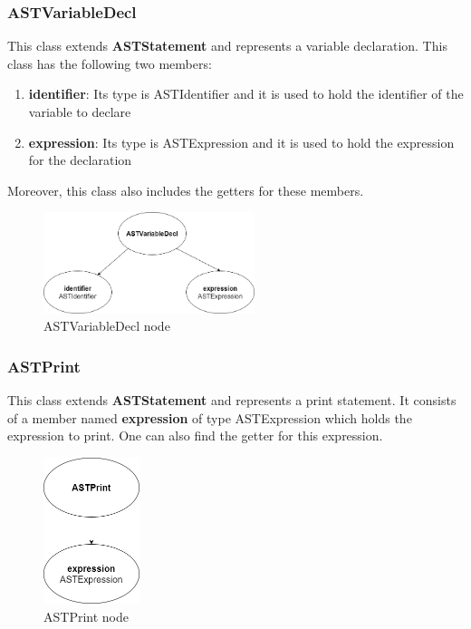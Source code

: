 \documentclass{article}
\begin{document}
					\subsubsection{ASTVariableDecl}
					
					This class extends \textbf{ASTStatement} and represents a variable declaration. This class has the following two members:
					\begin{enumerate}
					\item \textbf{identifier}: Its type is ASTIdentifier and it is used to hold the identifier of the variable to declare
					\item \textbf{expression}: Its type is ASTExpression and it is used to hold the expression for the declaration
					\end{enumerate}	
					Moreover, this class also includes the getters for these members.
			
					\begin{figure}[H]
					\centering
			 			\includegraphics[width=0.55\textwidth]{astvariabledecl.png}
			  			\caption{{ASTVariableDecl} node}
			  			\label{fig:astvariabledecl}
					\end{figure}
					
					\subsubsection{ASTPrint}
					
					This class extends \textbf{ASTStatement} and represents a print statement. It consists of a member named \textbf{expression} of type ASTExpression which holds the expression to print. One can also find the getter for this expression.
			
					\begin{figure}[H]
					\centering
			 			\includegraphics[width=0.25\textwidth]{astprint.png}
			  			\caption{{ASTPrint} node}
			  			\label{fig:astprint}
					\end{figure}
					 
\end{document}
